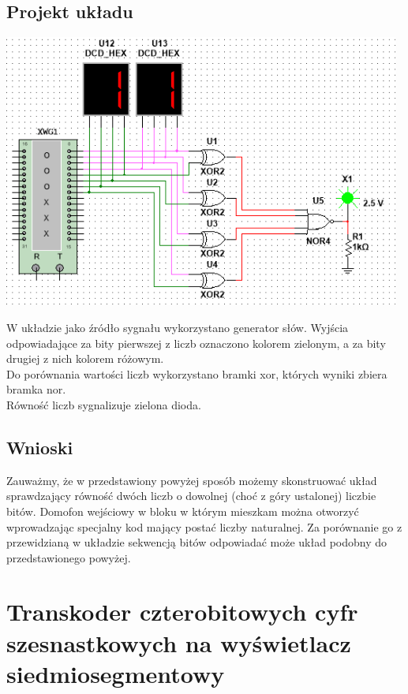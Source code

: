 \documentclass{article}
\begin{document}
        \subsection{Projekt układu}
            \begin{center}
                \includegraphics[height=9cm]{reports/img/Z1B_1.png}\\
            \end{center}
            W układzie jako źródło sygnału wykorzystano generator słów. Wyjścia odpowiadające za bity pierwszej z liczb oznaczono kolorem zielonym, a za bity drugiej z nich kolorem różowym. \\
            Do porównania wartości liczb wykorzystano bramki xor, których wyniki zbiera bramka nor. \\
            Równość liczb sygnalizuje zielona dioda. 
            \FloatBarrier
            
        \subsection{Wnioski}
            Zauważmy, że w przedstawiony powyżej sposób możemy skonstruować układ sprawdzający równość  dwóch liczb o dowolnej (choć z góry ustalonej) liczbie bitów. Domofon wejściowy w bloku w którym mieszkam można otworzyć wprowadzając specjalny kod mający postać liczby naturalnej. Za porównanie go z przewidzianą w układzie sekwencją bitów odpowiadać może układ podobny do przedstawionego powyżej. 

    \section{Transkoder czterobitowych cyfr szesnastkowych na wyświetlacz siedmiosegmentowy}
\end{document}
